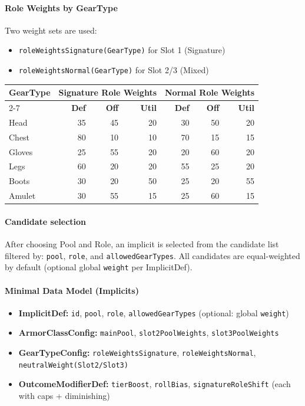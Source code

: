 \paragraph{Role Weights by GearType}
\noindent
Two weight sets are used:
\begin{itemize}
	\item \texttt{roleWeightsSignature(GearType)} for Slot 1 (Signature)
	\item \texttt{roleWeightsNormal(GearType)} for Slot 2/3 (Mixed)
\end{itemize}

\begin{center}
	\begin{tabular}{|l|r r r|r r r|}
		\hline
		\multirow{2}{*}{\textbf{GearType}} &
		\multicolumn{3}{c|}{\textbf{Signature} Role Weights} &
		\multicolumn{3}{c|}{\textbf{Normal} Role Weights} \\
		\cline{2-7}
		& \textbf{Def} & \textbf{Off} & \textbf{Util} & \textbf{Def} & \textbf{Off} & \textbf{Util} \\
		\hline
		Head   & 35 & 45 & 20 & 30 & 50 & 20 \\
		Chest  & 80 & 10 & 10 & 70 & 15 & 15 \\
		Gloves & 25 & 55 & 20 & 20 & 60 & 20 \\
		Legs   & 60 & 20 & 20 & 55 & 25 & 20 \\
		Boots  & 30 & 20 & 50 & 25 & 20 & 55 \\
		Amulet & 30 & 55 & 15 & 25 & 60 & 15 \\
		\hline
	\end{tabular}
\end{center}


\paragraph{Candidate selection}
\noindent
After choosing Pool and Role, an implicit is selected from the candidate list filtered by:
\texttt{pool}, \texttt{role}, and \texttt{allowedGearTypes}.
All candidates are equal-weighted by default (optional global \texttt{weight} per ImplicitDef).

\paragraph{Minimal Data Model (Implicits)}
\begin{itemize}
	\item \textbf{ImplicitDef:} \texttt{id}, \texttt{pool}, \texttt{role}, \texttt{allowedGearTypes} (optional: global \texttt{weight})
	\item \textbf{ArmorClassConfig:} \texttt{mainPool}, \texttt{slot2PoolWeights}, \texttt{slot3PoolWeights}
	\item \textbf{GearTypeConfig:} \texttt{roleWeightsSignature}, \texttt{roleWeightsNormal}, \texttt{neutralWeight(Slot2/Slot3)}
	\item \textbf{OutcomeModifierDef:} \texttt{tierBoost}, \texttt{rollBias}, \texttt{signatureRoleShift} (each with caps + diminishing)
\end{itemize}


